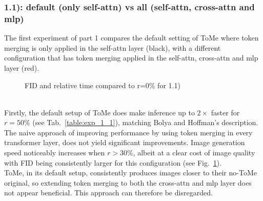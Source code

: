 \subsubsection*{1.1): default (only self-attn) vs all (self-attn, cross-attn and mlp)}
The first experiment of part 1 compares the default setting of ToMe where token merging is only applied in the self-attn layer (black), with a different configuration that has token merging applied in the self-attn, cross-attn and mlp layer (red). 
\begin{figure}[!htb]
\label{fig:exp_1_1}
   
   
\caption{FID and relative time compared to r=0\% for 1.1)}
\label{fig:exp_1_1}
\end{figure}\\
Firstly, the default setup of ToMe does make inference up to \(2 \times\) faster for \(r = 50\%\) (see Tab.~\ref{table:exp_1_1}), matching Bolya and Hoffman's description.\\
The naive approach of improving performance by using token merging in every transformer layer, does not yield significant improvements. Image generation speed noticeably increases when \(r > 30\%\), albeit at a clear cost of image quality with FID being consistently larger for this configuration (see Fig.~\ref{fig:exp_1_1}). \\
ToMe, in its default setup, consistently produces images closer to their no-ToMe original, so extending token merging to both the cross-attn and mlp layer does not appear beneficial. This approach can therefore be disregarded.



